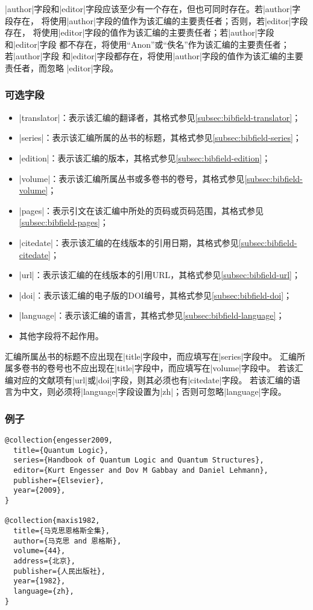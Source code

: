 \begin{note}
|author|字段和|editor|字段应该至少有一个存在，但也可同时存在。若|author|字段存在，
{\BibTeX}将使用|author|字段的值作为该汇编的主要责任者；否则，若|editor|字段存在，
{\BibTeX}将使用|editor|字段的值作为该汇编的主要责任者；若|author|字段和|editor|字段
都不存在，{\BibTeX}将使用``Anon''或``佚名''作为该汇编的主要责任者；若|author|字段
和|editor|字段都存在，{\BibTeX}将使用|author|字段的值作为该汇编的主要责任者，而忽略
|editor|字段。
\end{note}

\subsubsection{可选字段}

\begin{itemize}
\item |translator|：表示该汇编的翻译者，其格式参见\ref{subsec:bibfield-translator}；
\item |series|：表示该汇编所属的丛书的标题，其格式参见\ref{subsec:bibfield-series}；
\item |edition|：表示该汇编的版本，其格式参见\ref{subsec:bibfield-edition}；
\item |volume|：表示该汇编所属丛书或多卷书的卷号，其格式参见\ref{subsec:bibfield-volume}；
\item |pages|：表示引文在该汇编中所处的页码或页码范围，其格式参见\ref{subsec:bibfield-pages}；
\item |citedate|：表示该汇编的在线版本的引用日期，其格式参见\ref{subsec:bibfield-citedate}；
\item |url|：表示该汇编的在线版本的引用URL，其格式参见\ref{subsec:bibfield-url}；
\item |doi|：表示该汇编的电子版的DOI编号，其格式参见\ref{subsec:bibfield-doi}；
\item |language|：表示该汇编的语言，其格式参见\ref{subsec:bibfield-language}；
\item 其他字段将不起作用。
\end{itemize}

\begin{note}
汇编所属丛书的标题不应出现在|title|字段中，而应填写在|series|字段中。
汇编所属多卷书的卷号也不应出现在|title|字段中，而应填写在|volume|字段中。
若该汇编对应的文献项有|url|或|doi|字段，则其必须也有|citedate|字段。
若该汇编的语言为中文，则必须将|language|字段设置为|zh|；否则可忽略|language|字段。
\end{note}

\subsubsection{例子}

\begin{verbatim}
@collection{engesser2009,
  title={Quantum Logic},
  series={Handbook of Quantum Logic and Quantum Structures},
  editor={Kurt Engesser and Dov M Gabbay and Daniel Lehmann},
  publisher={Elsevier},  
  year={2009},  
}

@collection{maxis1982,
  title={马克思恩格斯全集},
  author={马克思 and 恩格斯},  
  volume={44},
  address={北京},
  publisher={人民出版社},
  year={1982},
  language={zh},
}
\end{verbatim}

